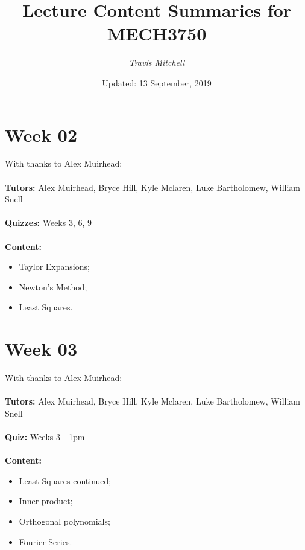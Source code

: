 \documentclass[11pt,a4paper]{report}
\author{\textit{Travis Mitchell}}
\title{Lecture Content Summaries for MECH3750}
\date{Updated: 13 September, 2019}
\begin{document}
	\maketitle
	\clearpage
	
	\begingroup
	\makeatletter
	\let\clearpage\relax
	\vspace*{\fill}
	\vspace*{\dimexpr-50\p@-\baselineskip}
	\chapter*{Week 02}
	With thanks to Alex Muirhead: \\\\
	\textbf{Tutors:} Alex Muirhead, Bryce Hill, Kyle Mclaren, Luke Bartholomew, William Snell \\\\
	\textbf{Quizzes:} Weeks 3, 6, 9 \\\\	
	\textbf{Content:}
	\begin{itemize}
		\item Taylor Expansions;
		\item Newton's Method;
		\item Least Squares.
	\end{itemize}
	\vspace*{\fill}
	\endgroup
	
	
	
	\begingroup
	\makeatletter
	\let\clearpage\relax
	\vspace*{\fill}%
	\vspace*{\dimexpr-50\p@-\baselineskip}
	\chapter*{Week 03}
	With thanks to Alex Muirhead: \\\\
	\textbf{Tutors:} Alex Muirhead, Bryce Hill, Kyle Mclaren, Luke Bartholomew, William Snell \\\\
	\textbf{Quiz:} Weeks 3 - 1pm \\\\	
	\textbf{Content:}
	\begin{itemize}
		\item Least Squares continued;
		\item Inner product;
		\item Orthogonal polynomials;
		\item Fourier Series.
	\end{itemize}
	\vspace*{\fill}
	\endgroup
	
	
\end{document}
